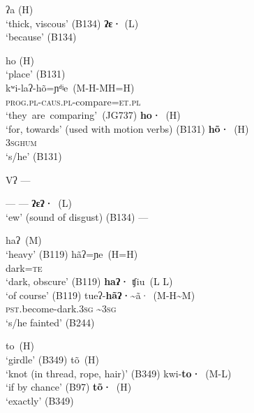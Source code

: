 \documentclass[output=paper]{langscibook}
\begin{document}
\ea
{}
          { ʔa   (H)\\
            \glt ‘thick, viscous’ (B134)
          }
          {\textbf{ʔɛ·}  (L)\\
               \glt ‘because’ (B134)
          }
          {}
          {}
\z


\ea
{}
     {ho (H)\\
          \glt ‘place’ (B131)\\
     }
     {kʷi-laʔ-hõ=ɲᵈʲe~(M-H-MH=H)\\
          \textsc{prog}.\textsc{pl}-\textsc{caus}.\textsc{pl}-compare=\textsc{et.pl}\\
          \glt \mbox{‘they are comparing’ (JG737)}
     }
     {\textbf{ho·}~(H)\\
          \glt ‘for, towards’ (used with motion verbs)  (B131)
     }
     {\gll \textbf{hõ·}~(H)\\
          3\textsc{sghum}\\
          \glt ‘s/he’  (B131)
     }
\z


\ea  Vʔ      ---
\z


\ea
{}
     {---}
     {---}
     {\textbf{ʔɛʔ·}~(L)\\
      \glt ‘ew’ (sound of disgust)  (B134)
      }
      {---}
\z

\newpage
\ea
{}
          {haʔ~(M)\\
               \glt ‘heavy’ (B119)
          }
          {\gll hãʔ=ɲe~(H=H) \\
               dark=\textsc{te}\\
               \glt ‘dark, obscure’  (B119)
          }
          {\textbf{haʔ·} ʧiu~(L L)\\
               \glt ‘of course’  (B119)
          }
          {\gll tueʔ-\textbf{hãʔ·}{\textasciitilde}ã·~(M-H{\textasciitilde}M)\\
               \textsc{pst}.become-dark.\textsc{3sg} {\textasciitilde}\textsc{3sg} \\
               \glt ‘s/he fainted’  (B244)
          }
\z

\ea
{}
          {to~(H) \\
               \glt ‘girdle’  (B349)
          }
          {tõ~(H) \\
               \glt ‘knot (in thread, rope, hair)’  (B349)
          }
          {kwi-\textbf{to·}~(M-L)\\
               \glt ‘if by chance’  (B97)
          }
          {\textbf{tõ·}~(H) \\
               \glt ‘exactly’  (B349)
          }
\z
\end{document}

